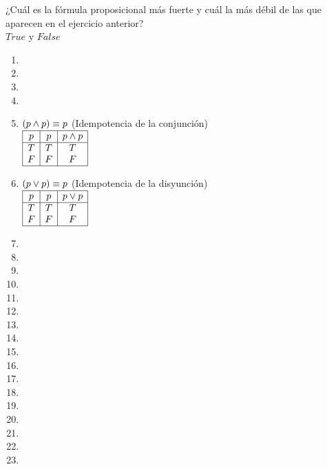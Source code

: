 \documentclass[12pt,a4paper,spanish]{article}
\begin{document}
\ejercicio ¿Cuál es la fórmula proposicional más fuerte y cuál la más débil de las que aparecen en el ejercicio anterior?\\
$True$ y $False$
\ejercicio\FiveStar\ 
\begin{multicols}{2}
	\begin{enumerate}[label=\alph*)]
		\item
		\item
		\item
		\item
		\item $(p \land p) \equiv p$ (Idempotencia de la conjunción)\\
		      $
			      \begin{array}{|c|c|c|}
				      \hline
				      p & p & p \land p \\ \hline
				      T & T & T      \\
				      F & F & F      \\ \hline
			      \end{array}
		      $
		\item $(p \lor p) \equiv p$ (Idempotencia de la disyunción)\\
		      $
			      \begin{array}{|c|c|c|}
				      \hline
				      p & p & p \lor p \\ \hline
				      T & T & T      \\
				      F & F & F      \\ \hline
			      \end{array}
		      $
		\item
		\item
		\item
		\item
		\item
		\item
		\item
		\item
		\item
		\item
		\item
		\item
		\item
		\item
		\item
		\item
		\item
	\end{enumerate}
\end{multicols}

\ejercicio
\ejercicio\FiveStar\ 
\ejercicio
\ejercicio\FiveStar\ 
\ejercicio
\end{document}
